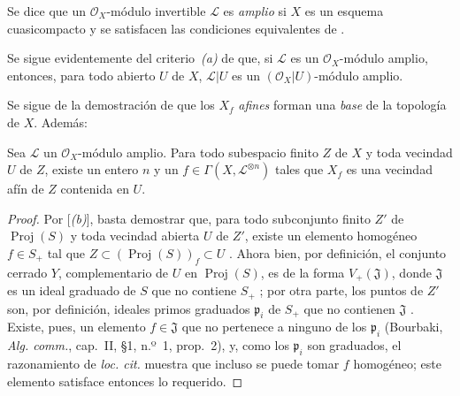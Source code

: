 \documentclass[oneside,10pt]{amsart}
\newcommand{\oldpage}[2][]{\marginnote{\normalfont\footnotesize\textbf{#1}~|~#2}\ignorespaces}
\let\EGAOriginalLabel\label
\renewcommand{\label}[1]{\phantomsection\EGAOriginalLabel{#1}}
\begin{document}
\begin{definition}[4.5.3]
\label{II.4.5.3-fr}
Se dice que un $\mathcal{O}_X$-módulo invertible $\mathcal{L}$ es \emph{amplio} si $X$ es un esquema cuasicompacto y se satisfacen las condiciones equivalentes de .
\end{definition}

Se sigue evidentemente del criterio~\emph{(a)} de  que, si $\mathcal{L}$ es un $\mathcal{O}_X$-módulo amplio, entonces, para todo abierto $U$ de $X$, $\mathcal{L}|U$ es un $(\mathcal{O}_X|U)$-módulo amplio.

Se sigue de la demostración de  que los $X_f$ \emph{afines} forman una \emph{base} de la topología de $X$.
Además:

\begin{corollary}[4.5.4]
\label{II.4.5.4-fr}
Sea $\mathcal{L}$ un $\mathcal{O}_X$-módulo amplio.
Para todo subespacio finito $Z$ de $X$ y toda vecindad $U$ de $Z$, existe un entero $n$ y un $f\in\Gamma(X,\mathcal{L}^{\otimes n})$ tales que $X_f$ es una vecindad afín de $Z$ contenida en $U$.
\end{corollary}

\begin{proof}
\oldpage[II]{85}
Por [\emph{(b)}], basta demostrar que, para todo subconjunto finito $Z'$ de $\operatorname{Proj}(S)$ y toda vecindad abierta $U$ de $Z'$, existe un elemento homogéneo $f\in S_+$ tal que $Z\subset(\operatorname{Proj}(S))_f\subset U$ .
Ahora bien, por definición, el conjunto cerrado $Y$, complementario de $U$ en $\operatorname{Proj}(S)$, es de la forma $V_+(\mathfrak{J})$, donde $\mathfrak{J}$ es un ideal graduado de $S$ que no contiene $S_+$ ;
por otra parte, los puntos de $Z'$ son, por definición, ideales primos graduados $\mathfrak{p}_i$ de $S_+$ que no contienen $\mathfrak{J}$ .
Existe, pues, un elemento $f\in\mathfrak{J}$ que no pertenece a ninguno de los $\mathfrak{p}_i$ (Bourbaki, \emph{Alg. comm.}, cap.~II, \S1, n.º~1, prop.~2), y, como los $\mathfrak{p}_i$ son graduados, el razonamiento de \emph{loc. cit.} muestra que incluso se puede tomar $f$ homogéneo;
este elemento satisface entonces lo requerido.
\end{proof}
\end{document}
